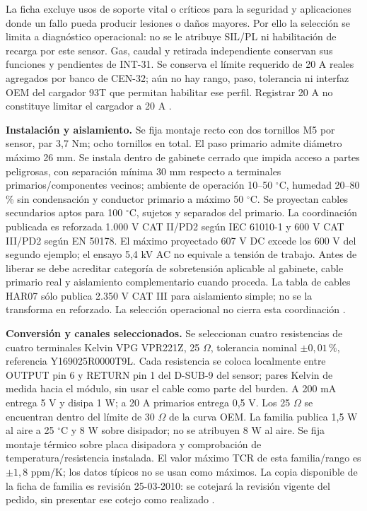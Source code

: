 La ficha excluye usos de soporte vital o críticos para la seguridad y aplicaciones donde un fallo pueda producir lesiones o daños mayores. Por ello la selección se limita a diagnóstico operacional: no se le atribuye SIL/PL ni habilitación de recarga por este sensor. Gas, caudal y retirada independiente conservan sus funciones y pendientes de INT-31. Se conserva el límite requerido de 20 A reales agregados por banco de CEN-32; aún no hay rango, paso, tolerancia ni interfaz OEM del cargador 93T que permitan habilitar ese perfil. Registrar 20 A no constituye limitar el cargador a 20 A \parencite[p.~11]{lote35-lem200}.

\textbf{Instalación y aislamiento.} Se fija montaje recto con dos tornillos M5 por sensor, par 3,7 Nm; ocho tornillos en total. El paso primario admite diámetro máximo 26 mm. Se instala dentro de gabinete cerrado que impida acceso a partes peligrosas, con separación mínima 30 mm respecto a terminales primarios/componentes vecinos; ambiente de operación 10--50 $^\circ$C, humedad 20--80\,\% sin condensación y conductor primario a máximo 50 $^\circ$C. Se proyectan cables secundarios aptos para 100 $^\circ$C, sujetos y separados del primario. La coordinación publicada es reforzada 1.000 V CAT II/PD2 según IEC 61010-1 y 600 V CAT III/PD2 según EN 50178. El máximo proyectado 607 V DC excede los 600 V del segundo ejemplo; el ensayo 5,4 kV AC no equivale a tensión de trabajo. Antes de liberar se debe acreditar categoría de sobretensión aplicable al gabinete, cable primario real y aislamiento complementario cuando proceda. La tabla de cables HAR07 sólo publica 2.350 V CAT III para aislamiento simple; no se la transforma en reforzado. La selección operacional no cierra esta coordinación \parencite[pp.~2--4 y 10]{lote35-lem200}.

\textbf{Conversión y canales seleccionados.} Se seleccionan cuatro resistencias de cuatro terminales Kelvin VPG VPR221Z, 25 $\Omega$, tolerancia nominal $\pm0,01\,\%$, referencia Y169025R0000T9L. Cada resistencia se coloca localmente entre OUTPUT pin 6 y RETURN pin 1 del D-SUB-9 del sensor; pares Kelvin de medida hacia el módulo, sin usar el cable como parte del burden. A 200 mA entrega 5 V y disipa 1 W; a 20 A primarios entrega 0,5 V. Los 25 $\Omega$ se encuentran dentro del límite de 30 $\Omega$ de la curva OEM. La familia publica 1,5 W al aire a 25 $^\circ$C y 8 W sobre disipador; no se atribuyen 8 W al aire. Se fija montaje térmico sobre placa disipadora y comprobación de temperatura/resistencia instalada. El valor máximo TCR de esta familia/rango es $\pm1,8$ ppm/K; los datos típicos no se usan como máximos. La copia disponible de la ficha de familia es revisión 25-03-2010: se cotejará la revisión vigente del pedido, sin presentar ese cotejo como realizado \parencites[pp.~8 y 10]{lote35-lem200}[pp.~1--3]{lote35-vprfamily}{lote35-vprsku}.

